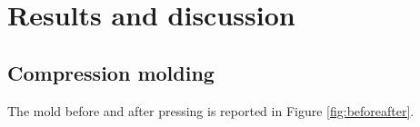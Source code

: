 \documentclass[a4paper, 11pt]{article}
\begin{document}
\newpage

\section{Results and discussion}

\subsection{Compression molding}

The mold before and after pressing is reported in Figure \ref{fig:beforeafter}. 

\begin{figure}[htp]
	\centering
	 \qquad 
	\subfloat[][]

\end{figure}
\end{document}
